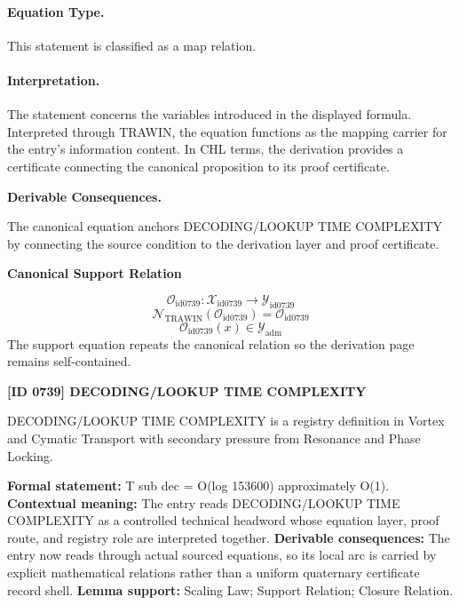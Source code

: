 \paragraph{Equation Type.}
This statement is classified as a map relation.

\paragraph{Interpretation.}
The statement concerns the variables introduced in the displayed formula. Interpreted through TRAWIN, the equation functions as the mapping carrier for the entry’s information content. In CHL terms, the derivation provides a certificate connecting the canonical proposition to its proof certificate.

\par\vspace{0.35em}
\noindent\textbf{Derivable Consequences.}\quad
\begingroup
\footnotesize
\raggedright
The canonical equation anchors DECODING/LOOKUP TIME COMPLEXITY by connecting the source condition to the derivation layer and proof certificate.
\par\endgroup

\noindent\textbf{Canonical Support Relation}\par
\[
\mathcal{O}_{\mathrm{id0739}}:\mathcal{X}_{\mathrm{id0739}}\longrightarrow\mathcal{Y}_{\mathrm{id0739}}
\]
\[
\mathcal{N}_{\mathrm{TRAWIN}}(\mathcal{O}_{\mathrm{id0739}})=\mathcal{O}_{\mathrm{id0739}}
\]
\[
\mathcal{O}_{\mathrm{id0739}}(x)\in\mathcal{Y}_{\mathrm{adm}}
\]
\noindent The support equation repeats the canonical relation so the derivation page remains self-contained.\par

\clearpage
\noindent\textbf{[ID 0739] DECODING/LOOKUP TIME COMPLEXITY}\par
\vspace{0.35em}
\begingroup\small
{}
DECODING/LOOKUP TIME COMPLEXITY is a registry definition in Vortex and Cymatic Transport with secondary pressure from Resonance and Phase Locking.

\begingroup\footnotesize\setlength{\emergencystretch}{3em}\sloppy
\textbf{Formal statement:} T sub dec = O(log 153600) approximately O(1). \textbf{Contextual meaning:} The entry reads DECODING/LOOKUP TIME COMPLEXITY as a controlled technical headword whose equation layer, proof route, and registry role are interpreted together. \textbf{Derivable consequences:} The entry now reads through actual sourced equations, so its local arc is carried by explicit mathematical relations rather than a uniform quaternary certificate record shell. \textbf{Lemma support:} Scaling Law; Support Relation; Closure Relation.\par
\endgroup

